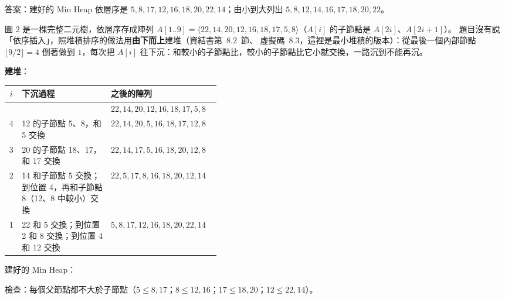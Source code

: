 \begin{pastsoln}
答案：建好的 Min Heap 依層序是 $5, 8, 17, 12, 16, 18, 20, 22, 14$；由小到大列出 $5, 8, 12, 14, 16, 17, 18, 20, 22$。

圖 2 是一棵完整二元樹，依層序存成陣列 $A[1..9] = \langle 22, 14, 20, 12, 16, 18, 17, 5, 8\rangle$（$A[i]$ 的子節點是
$A[2i]$、$A[2i + 1]$）。 題目沒有說「依序插入」，照堆積排序的做法用\textbf{由下而上}建堆（資結書第~8.2~節、
虛擬碼~8.3，這裡是最小堆積的版本）：從最後一個內部節點 $\lfloor 9/2 \rfloor = 4$ 倒著做到 $1$，每次把 $A[i]$
往下沉：和較小的子節點比，較小的子節點比它小就交換，一路沉到不能再沉。

\textbf{建堆}：
\begin{center}
\small
\begin{tabular}{cp{0.42\linewidth}l}
\toprule
$i$ & 下沉過程 & 之後的陣列 \\
\midrule
 & & $22, 14, 20, 12, 16, 18, 17, 5, 8$ \\
4 & 12 的子節點 5、8，和 5 交換 & $22, 14, 20, 5, 16, 18, 17, 12, 8$ \\
3 & 20 的子節點 18、17，和 17 交換 & $22, 14, 17, 5, 16, 18, 20, 12, 8$ \\
2 & 14 和子節點 5 交換；到位置 4，再和子節點 8（12、8 中較小）交換 & $22, 5, 17, 8, 16, 18, 20, 12, 14$ \\
1 & 22 和 5 交換；到位置 2 和 8 交換；到位置 4 和 12 交換 & $5, 8, 17, 12, 16, 18, 20, 22, 14$ \\
\bottomrule
\end{tabular}
\end{center}
建好的 Min Heap：
\begin{center}
\end{center}
檢查：每個父節點都不大於子節點（$5 \le 8, 17$；$8 \le 12, 16$；$17 \le 18, 20$；$12 \le 22, 14$）。


\end{pastsoln}
